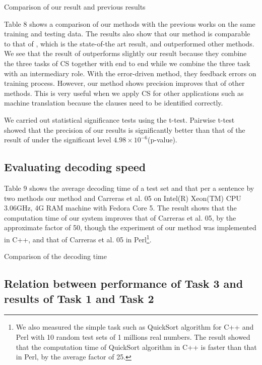 \documentclass[english]{jnlp_1.4}
\begin{document}
{\begin{table}[b]
\caption{Comparison of our result and previous results}
\label{table:task_all}

\end{table}

Table 8 shows a comparison of our methods with the previous works
on the same training and testing data. The results also show that
our method is comparable to that of \cite{Carreras2005}, which is
the state-of-the art result, and outperformed other methods. We
see that the result of \cite{Carreras2005} outperforms slightly
our result because they combine the three tasks of CS together
with end to end while we combine the three task with an
intermediary role. With the error-driven method, they feedback
errors on training process. However, our method shows precision
improves that of other methods. This is very useful when we apply
CS for other applications such as machine translation because the
clauses need to be identified correctly.

We carried out statistical significance tests using the t-test.
Pairwise t-test showed that the precision of our results is
significantly better than that of the result of \cite{Carreras2005}
under the significant level $4.98\times 10^{-6}$(p-value).


\subsection{Evaluating decoding speed}

Table 9 shows the average decoding time of a test set and that per
a sentence by two methods our method and Carreras et al. 05 on
Intel(R) Xeon(TM) CPU 3.06GHz, 4G RAM machine with Fedora Core 5.
The result shows that the computation time of our system improves
that of Carreras et al. 05, by the approximate factor of 50,
though the experiment of our method was implemented in C++, and
that of Carreras et al. 05 in Perl\footnote{We also measured the
simple task such as QuickSort algorithm for C++ and Perl with 10
random test sets of 1 millions real numbers. The result showed
that the computation time of QuickSort algorithm in C++ is faster
than that in Perl, by the average factor of 25.}.

\begin{table}[t]
\caption{Comparison of the decoding time}

\end{table}


\subsection{Relation between performance of Task 3 and results of Task 1 and Task 2}

}
\end{document}
